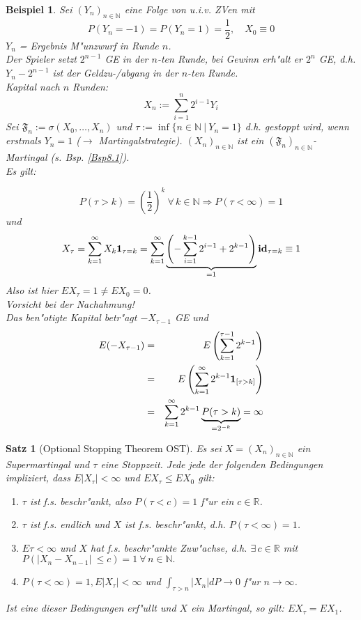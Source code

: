 \documentclass[a4paper,11pt]{book}
\newcommand{\R}{{\mathbb R}}
\newcommand{\N}{{\mathbb N}}
\newcommand{\ind}{\text{\bf{1}}}
\newcommand{\id}{\text{\bf{id}}}
\def\FF{ \mathfrak{F} }
\newtheorem{Sa}{Satz}[chapter]
\newtheorem{Bsp}{Beispiel}[chapter]
\theoremstyle{nonumberplain}
\begin{document}
\begin{Bsp} \label{Bsp8.6}
Sei $(Y_n)_{n \in \N}$ eine Folge von u.i.v. ZVen mit
\[
P(Y_n = -1) = P(Y_n = 1) = \frac12, \quad X_0 \equiv 0
\]
$Y_n$ = Ergebnis M"unzwurf in Runde $n$.\\
Der Spieler setzt $2^{n-1}$ GE in der $n$-ten Runde, bei Gewinn erh"alt er $2^n$ GE, d.h. $Y_n - 2^{n-1}$ ist der Geldzu-/abgang in der $n$-ten Runde.\\
Kapital nach $n$ Runden:
\[
X_n := \sum_{i=1}^n 2^{i-1}Y_i
\]
Sei $\FF_n := \sigma(X_0,\dots,X_n)$ und $\tau := \inf\{n \in \N\ |\ Y_n = 1\}$ d.h. gestoppt wird, wenn erstmals $Y_n = 1$ ($\rightarrow$ Martingalstrategie). $(X_n)_{n \in \N}$ ist ein $(\FF_n)_{n \in \N}$-Martingal (s. Bsp. \ref{Bsp8.1}).\\
Es gilt:

\[
P(\tau > k) = \left( \frac12 \right)^k \ \forall\, k \in \N \Rightarrow P(\tau < \infty) = 1
\]
und
\[
X_{\tau} = \sum_{k=1}^{\infty} X_k \ind_{\tau = k} = \sum_{k=1}^{\infty} \underbrace{\left( - \sum_{i=1}^{k-1} 2^{i-1} + 2^{k-1} \right)}_{= 1} \id_{\tau = k} \equiv 1
\]
Also ist hier $EX_{\tau} = 1 \not= EX_0 = 0$.\\
Vorsicht  bei der Nachahmung!\\
Das ben"otigte Kapital betr"agt $-X_{\tau-1}$ GE und
\begin{eqnarray*}
E(-X_{\tau-1}) & = & E \left( \sum_{k=1}^{\tau-1} 2^{k-1} \right) \\
& = & E \left( \sum_{k=1}^{\infty} 2^{k-1} \ind_{[\tau > k]} \right) \\
& = & \sum_{k=1}^{\infty} 2^{k-1} \underbrace{P(\tau > k)}_{= 2^{-k}} = \infty
\end{eqnarray*}
\end{Bsp}

\begin{Sa}[Optional Stopping Theorem OST] \label{Sa8.6}
Es sei $X = (X_n)_{n \in \N}$ ein Supermartingal und $\tau$ eine Stoppzeit. Jede jede der folgenden Bedingungen impliziert, dass $E|X_{\tau}| < \infty$ und $EX_{\tau} \leq EX_0$ gilt:
\begin{enumerate}
\item $\tau$ ist f.s. beschr"ankt, also $P(\tau < c) = 1$ f"ur ein $c \in \R$.

\item $\tau$ ist f.s. endlich und $X$ ist f.s. beschr"ankt, d.h. $P(\tau < \infty) = 1$.

\item $E\tau < \infty$ und $X$ hat f.s. beschr"ankte Zuw"achse, d.h. $\exists\, c \in \R$ mit $P(|X_n-X_{n-1}|~\leq c) = 1 \ \forall\, n \in \N.$

\item $P(\tau < \infty) = 1, E|X_{\tau}| < \infty$ und $\int_{\tau > n} |X_n|dP \rightarrow 0$ f"ur $n \rightarrow \infty$.
\end{enumerate}
Ist eine dieser Bedingungen erf"ullt und $X$ ein Martingal, so gilt: $EX_{\tau} = EX_1$.
\end{Sa}
\end{document}
